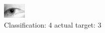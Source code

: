 \begin{figure}[h!]
\begin{center}
\includegraphics[width=0.60\columnwidth]{figures/ID1323_class_4_target_3.png}
\end{center}
\caption{ Classification: 4 actual target: 3}
\label{fig:ID1323_class_4_target_3}
\end{figure}
